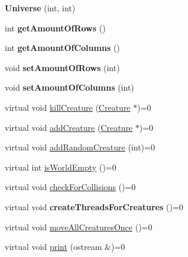 \begin{DoxyCompactItemize}
\item 
{\bfseries Universe} (int, int)\hypertarget{class_universe_ad3f8dfc7f0c2e14d08779fc84a8d893a}{}\label{class_universe_ad3f8dfc7f0c2e14d08779fc84a8d893a}

\item 
int {\bfseries get\+Amount\+Of\+Rows} ()\hypertarget{class_universe_a8f219d93acf88902438497356fb4b79d}{}\label{class_universe_a8f219d93acf88902438497356fb4b79d}

\item 
int {\bfseries get\+Amount\+Of\+Columns} ()\hypertarget{class_universe_a5b0a0f6b1927e223b0a18f2474a05711}{}\label{class_universe_a5b0a0f6b1927e223b0a18f2474a05711}

\item 
void {\bfseries set\+Amount\+Of\+Rows} (int)\hypertarget{class_universe_af0124aca57a7ff286132e8525bd1c378}{}\label{class_universe_af0124aca57a7ff286132e8525bd1c378}

\item 
void {\bfseries set\+Amount\+Of\+Columns} (int)\hypertarget{class_universe_a9597c59c4bf80e17c852596acf25dfc4}{}\label{class_universe_a9597c59c4bf80e17c852596acf25dfc4}

\item 
virtual void \hyperlink{class_universe_ae92953c55e994fd3db8ac022ef69c227}{kill\+Creature} (\hyperlink{class_creature}{Creature} $\ast$)=0
\item 
virtual void \hyperlink{class_universe_a882e14be433281816c58b9ccfb8d4d01}{add\+Creature} (\hyperlink{class_creature}{Creature} $\ast$)=0
\item 
virtual void \hyperlink{class_universe_a7289af8da66eed7c88763342c5689efb}{add\+Random\+Creature} (int)=0
\item 
virtual int \hyperlink{class_universe_a090dce863386ed5cdba01d440de1edfd}{is\+World\+Empty} ()=0
\item 
virtual void \hyperlink{class_universe_aaefe829c75ee2290de431e16065dde83}{check\+For\+Collisions} ()=0
\item 
virtual void {\bfseries create\+Threads\+For\+Creatures} ()=0\hypertarget{class_universe_ab7d79c7d4f6c76f9f15ba1aec1c81c9f}{}\label{class_universe_ab7d79c7d4f6c76f9f15ba1aec1c81c9f}

\item 
virtual void \hyperlink{class_universe_af6fafeecd9df7c0c2b83760cef4eced3}{move\+All\+Creatures\+Once} ()=0
\item 
virtual void \hyperlink{class_universe_a646c85dce1a89e8da9b7f8c7c71cb2e3}{print} (ostream \&)=0
\end{DoxyCompactItemize}


